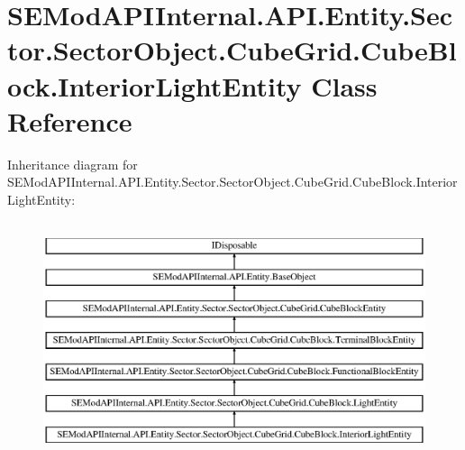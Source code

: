 \hypertarget{class_s_e_mod_a_p_i_internal_1_1_a_p_i_1_1_entity_1_1_sector_1_1_sector_object_1_1_cube_grid_1_1a65b5dd2ac66850e8addbe9864d4daa6}{}\section{S\+E\+Mod\+A\+P\+I\+Internal.\+A\+P\+I.\+Entity.\+Sector.\+Sector\+Object.\+Cube\+Grid.\+Cube\+Block.\+Interior\+Light\+Entity Class Reference}
\label{class_s_e_mod_a_p_i_internal_1_1_a_p_i_1_1_entity_1_1_sector_1_1_sector_object_1_1_cube_grid_1_1a65b5dd2ac66850e8addbe9864d4daa6}
Inheritance diagram for S\+E\+Mod\+A\+P\+I\+Internal.\+A\+P\+I.\+Entity.\+Sector.\+Sector\+Object.\+Cube\+Grid.\+Cube\+Block.\+Interior\+Light\+Entity\+:\begin{figure}[H]
\begin{center}
\leavevmode
\includegraphics[height=7.000000cm]{class_s_e_mod_a_p_i_internal_1_1_a_p_i_1_1_entity_1_1_sector_1_1_sector_object_1_1_cube_grid_1_1a65b5dd2ac66850e8addbe9864d4daa6}
\end{center}
\end{figure}
